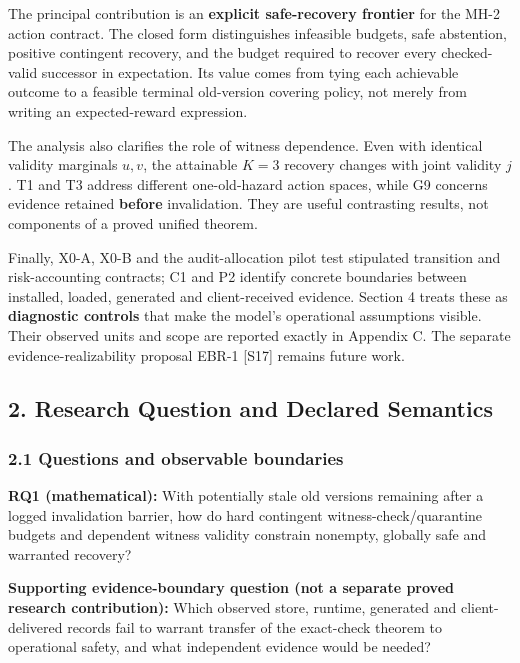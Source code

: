 \documentclass[
  10pt,
  american,
  a4paper,
]{article}
\begin{document}
The principal contribution is an \textbf{explicit safe-recovery
frontier} for the MH-2 action contract. The closed form distinguishes
infeasible budgets, safe abstention, positive contingent recovery, and
the budget required to recover every checked-valid successor in
expectation. Its value comes from tying each achievable outcome to a
feasible terminal old-version covering policy, not merely from writing
an expected-reward expression.

The analysis also clarifies the role of witness dependence. Even with
identical validity marginals \(u,v\), the attainable \(K=3\) recovery
changes with joint validity \(j\). T1 and T3 address different
one-old-hazard action spaces, while G9 concerns evidence retained
\textbf{before} invalidation. They are useful contrasting results, not
components of a proved unified theorem.

Finally, X0-A, X0-B and the audit-allocation pilot test stipulated
transition and risk-accounting contracts; C1 and P2 identify concrete
boundaries between installed, loaded, generated and client-received
evidence. Section 4 treats these as \textbf{diagnostic controls} that
make the model's operational assumptions visible. Their observed units
and scope are reported exactly in Appendix C. The separate
evidence-realizability proposal EBR-1 {[}S17{]} remains future work.

\hypertarget{research-question-and-declared-semantics}{%
\subsection{2. Research Question and Declared
Semantics}\label{research-question-and-declared-semantics}}

\hypertarget{questions-and-observable-boundaries}{%
\subsubsection{2.1 Questions and observable
boundaries}\label{questions-and-observable-boundaries}}

\textbf{RQ1 (mathematical):} With potentially stale old versions
remaining after a logged invalidation barrier, how do hard contingent
witness-check/quarantine budgets and dependent witness validity
constrain nonempty, globally safe and warranted recovery?

\textbf{Supporting evidence-boundary question (not a separate proved
research contribution):} Which observed store, runtime, generated and
client-delivered records fail to warrant transfer of the exact-check
theorem to operational safety, and what independent evidence would be
needed?
\end{document}
